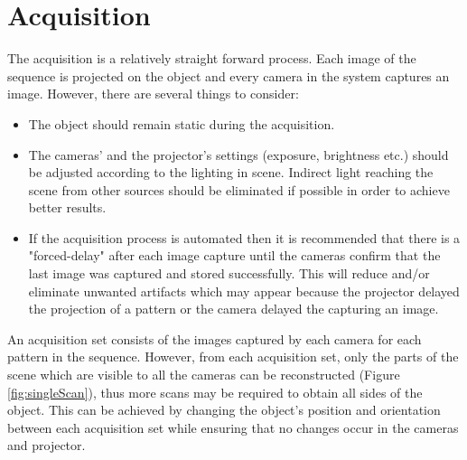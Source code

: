 \documentclass[final,12pt,3p]{elsarticle}
\begin{document}
\section{Acquisition}
\label{sec:acquisition}
The acquisition is a relatively straight forward process. Each image of the sequence is projected on the object and every camera in the system captures an image. However, there are several things to consider:
\begin{itemize}
	\item The object should remain static during the acquisition.
	\item The cameras' and the projector's settings (exposure, brightness etc.) should be adjusted according to the lighting in scene. Indirect light reaching the scene from other sources should be eliminated if possible in order to achieve better results. 
	\item If the acquisition process is automated then it is recommended that there is a "forced-delay" after each image capture until the cameras confirm that the last image was captured and stored successfully. This will reduce and/or eliminate unwanted artifacts which may appear because the projector delayed the projection of a pattern or the camera delayed the capturing an image.
\end{itemize}

An acquisition set consists of the images captured by each camera for each pattern in the sequence. However, from each acquisition set, only the parts of the scene which are visible to all the cameras can be reconstructed (Figure \ref{fig:singleScan}), thus more scans may be required to obtain all sides of the object. This can be achieved by changing the object's position and orientation between each acquisition set while ensuring that no changes occur in the cameras and projector.
\end{document}
